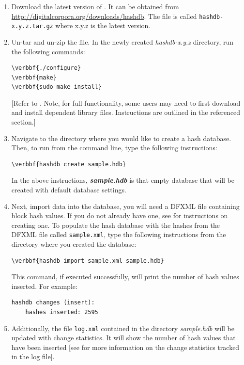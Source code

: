 \documentclass[11pt,fleqn]{article} %
\begin{document}
\begin{enumerate}
\item Download the latest version of \hash. It can be obtained from \url{http://digitalcorpora.org/downloads/hashdb}. The file is called \texttt{hashdb-x.y.z.tar.gz} where x.y.z is the latest version. 

\item Un-tar and un-zip the file.  In the newly created \textit{hashdb-x.y.z} directory, run the following commands:

\begin{Verbatim}[commandchars=\\\{\}]
\verbbf{./configure}
\verbbf{make}
\verbbf{sudo make install}
\end{Verbatim}
[Refer to \textbf{}. Note, for full functionality, some users may need to first download and install dependent library files. Instructions are outlined in the referenced section.]

\item Navigate to the directory where you would like to create a hash database. Then, to run \hash from the command line, type the following instructions: 
\begin{Verbatim}[commandchars=\\\{\}]
\verbbf{hashdb create sample.hdb}
\end{Verbatim} 

In the above instructions, \textit{\textbf{sample.hdb}} is that empty database that will be created with default database settings. 

\item Next, import data into the database, you will need a DFXML file containing block hash values. If you do not already have one, see \textbf{} for instructions on creating one. To populate the hash database with the hashes from the DFXML file called \texttt{sample.xml}, type the following instructions from the directory where you created the database:
\begin{Verbatim}[commandchars=\\\{\}]
\verbbf{hashdb import sample.xml sample.hdb}
\end{Verbatim} 
This command, if executed successfully, will print the number of hash values inserted. For example: 
\begingroup
\footnotesize
\begin{Verbatim}[fontfamily=courier]
hashdb changes (insert):
    hashes inserted: 2595
\end{Verbatim}
\endgroup
\item Additionally, the file \texttt{log.xml} contained in the directory \textit{sample.hdb} will be updated with change statistics. It will show the number of hash values that have been inserted [see \textbf{ }for more information on the change statistics tracked in the log file].
\end{enumerate}
\newpage
\end{document}

